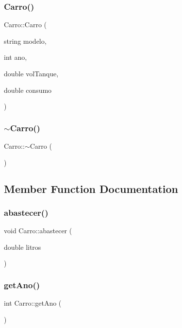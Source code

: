 \subsubsection{\texorpdfstring{Carro()}{Carro()}}
{\footnotesize\ttfamily Carro\+::\+Carro (\begin{DoxyParamCaption}\item[{string}]{modelo,  }\item[{int}]{ano,  }\item[{double}]{vol\+Tanque,  }\item[{double}]{consumo }\end{DoxyParamCaption})}

\mbox{\label{classCarro_a7e31c4a7fba7088be8cef8b499c128bd}} 
\subsubsection{\texorpdfstring{$\sim$\+Carro()}{~Carro()}}
{\footnotesize\ttfamily Carro\+::$\sim$\+Carro (\begin{DoxyParamCaption}{ }\end{DoxyParamCaption})}



\subsection{Member Function Documentation}
\mbox{\label{classCarro_a1e7b1b9338a7f6e3a63924f8a5a97ae3}} 
\subsubsection{\texorpdfstring{abastecer()}{abastecer()}}
{\footnotesize\ttfamily void Carro\+::abastecer (\begin{DoxyParamCaption}\item[{double}]{litros }\end{DoxyParamCaption})}

\mbox{\label{classCarro_ad8ee3c0f53d6c3014cf7e70eaa310fbf}} 
\subsubsection{\texorpdfstring{get\+Ano()}{getAno()}}
{\footnotesize\ttfamily int Carro\+::get\+Ano (\begin{DoxyParamCaption}{ }\end{DoxyParamCaption})}

